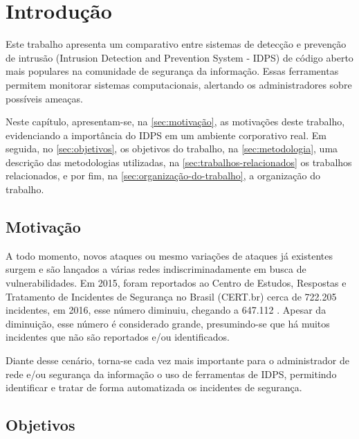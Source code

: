 \chapter{Introdução} \label{ch:introdução}
Este trabalho apresenta um comparativo entre sistemas de detecção e prevenção de intrusão (Intrusion Detection and Prevention System - IDPS) de código aberto mais populares na comunidade de segurança da informação. Essas ferramentas permitem monitorar sistemas computacionais, alertando os administradores sobre possíveis ameaças.

Neste capítulo, apresentam-se, na \autoref{sec:motivação}, as motivações deste trabalho, evidenciando a importância do IDPS em um ambiente corporativo real. Em seguida, no \autoref{sec:objetivos}, os objetivos do trabalho, na \autoref{sec:metodologia}, uma descrição das metodologias utilizadas, na \autoref{sec:trabalhos-relacionados} os trabalhos relacionados, e por fim, na \autoref{sec:organização-do-trabalho}, a organização do trabalho.

\section{Motivação} \label{sec:motivação} 

A todo momento, novos ataques ou mesmo variações de ataques já existentes surgem e são lançados a várias redes indiscriminadamente em busca de vulnerabilidades. Em 2015, foram reportados ao Centro de Estudos, Respostas e Tratamento de Incidentes de Segurança no Brasil (CERT.br) cerca de 722.205 incidentes, em 2016, esse número diminuiu, chegando a 647.112 \cite{estatistica:cert.br}. Apesar da diminuição, esse número é considerado grande, presumindo-se que há muitos incidentes que não são reportados e/ou identificados.

Diante desse cenário, torna-se cada vez mais importante para o administrador de rede e/ou segurança da informação o uso de ferramentas de IDPS, permitindo identificar e tratar de forma automatizada os incidentes de segurança.

\section{Objetivos} \label{sec:objetivos}

